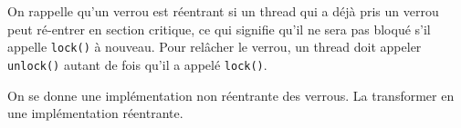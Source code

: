 
\begingroup

\begin{exercice}
  \label{exo:locks/reentrance}
  
  On rappelle qu'un verrou est réentrant si un thread qui a déjà pris un verrou peut
  ré-entrer en section critique, ce qui signifie qu'il ne sera pas bloqué s'il
  appelle \lstinline{lock()} à nouveau.
  Pour relâcher le verrou, un thread doit appeler \lstinline{unlock()} autant
  de fois qu'il a appelé \lstinline{lock()}.
  
  \begin{question}
  \item On se donne une implémentation non réentrante des verrous.
    La transformer en une implémentation réentrante.
  \end{question}

\end{exercice}

\endgroup
\endinput
